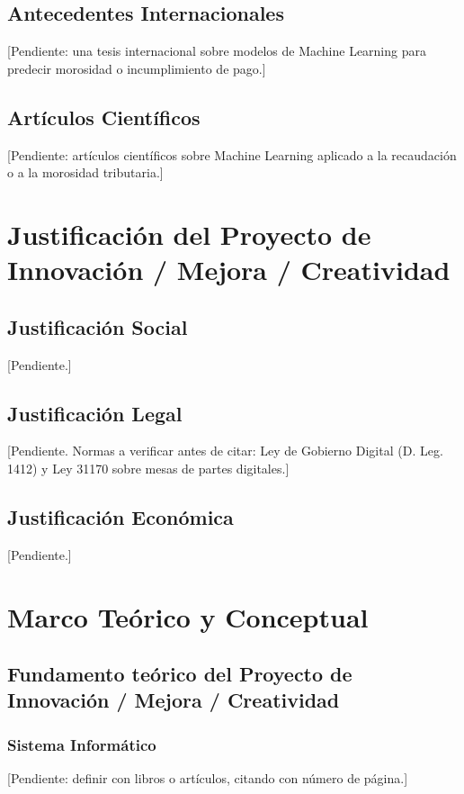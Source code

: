 \documentclass[12pt,a4paper]{report}
\begin{document}
\subsection*{Antecedentes Internacionales}
[Pendiente: una tesis internacional sobre modelos de Machine Learning para predecir morosidad o incumplimiento de pago.]

\subsection*{Artículos Científicos}
[Pendiente: artículos científicos sobre Machine Learning aplicado a la recaudación o a la morosidad tributaria.]

\section{Justificación del Proyecto de Innovación / Mejora / Creatividad}

\subsection{Justificación Social}
[Pendiente.]

\subsection{Justificación Legal}
[Pendiente. Normas a verificar antes de citar: Ley de Gobierno Digital (D. Leg. 1412) y Ley 31170 sobre mesas de partes digitales.]

\subsection{Justificación Económica}
[Pendiente.]

\section{Marco Teórico y Conceptual}

\subsection{Fundamento teórico del Proyecto de Innovación / Mejora / Creatividad}

\subsubsection{Sistema Informático}
[Pendiente: definir con libros o artículos, citando con número de página.]
\end{document}
